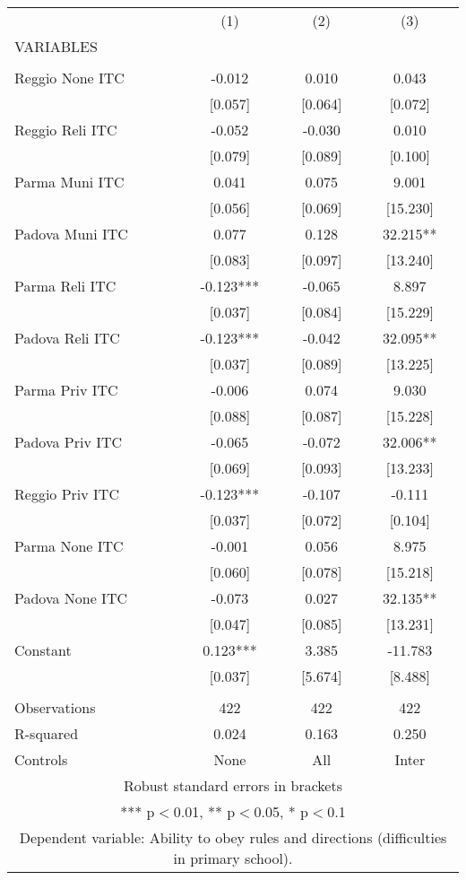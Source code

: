 \begin{tabular}{lccc} \hline
 & (1) & (2) & (3) \\
VARIABLES &  &  &  \\ \hline
 &  &  &  \\
Reggio None ITC & -0.012 & 0.010 & 0.043 \\
 & [0.057] & [0.064] & [0.072] \\
Reggio Reli ITC & -0.052 & -0.030 & 0.010 \\
 & [0.079] & [0.089] & [0.100] \\
Parma Muni ITC & 0.041 & 0.075 & 9.001 \\
 & [0.056] & [0.069] & [15.230] \\
Padova Muni ITC & 0.077 & 0.128 & 32.215** \\
 & [0.083] & [0.097] & [13.240] \\
Parma Reli ITC & -0.123*** & -0.065 & 8.897 \\
 & [0.037] & [0.084] & [15.229] \\
Padova Reli ITC & -0.123*** & -0.042 & 32.095** \\
 & [0.037] & [0.089] & [13.225] \\
Parma Priv ITC & -0.006 & 0.074 & 9.030 \\
 & [0.088] & [0.087] & [15.228] \\
Padova Priv ITC & -0.065 & -0.072 & 32.006** \\
 & [0.069] & [0.093] & [13.233] \\
Reggio Priv ITC & -0.123*** & -0.107 & -0.111 \\
 & [0.037] & [0.072] & [0.104] \\
Parma None ITC & -0.001 & 0.056 & 8.975 \\
 & [0.060] & [0.078] & [15.218] \\
Padova None ITC & -0.073 & 0.027 & 32.135** \\
 & [0.047] & [0.085] & [13.231] \\
Constant & 0.123*** & 3.385 & -11.783 \\
 & [0.037] & [5.674] & [8.488] \\
 &  &  &  \\
Observations & 422 & 422 & 422 \\
R-squared & 0.024 & 0.163 & 0.250 \\
 Controls & None & All & Inter \\ \hline
\multicolumn{4}{c}{ Robust standard errors in brackets} \\
\multicolumn{4}{c}{ *** p$<$0.01, ** p$<$0.05, * p$<$0.1} \\
\multicolumn{4}{c}{ Dependent variable: Ability to obey rules and directions (difficulties in primary school).} \\
\end{tabular}
